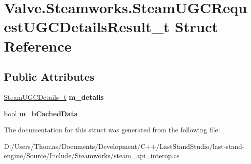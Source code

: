 \hypertarget{structValve_1_1Steamworks_1_1SteamUGCRequestUGCDetailsResult__t}{}\section{Valve.\+Steamworks.\+Steam\+U\+G\+C\+Request\+U\+G\+C\+Details\+Result\+\_\+t Struct Reference}
\label{structValve_1_1Steamworks_1_1SteamUGCRequestUGCDetailsResult__t}
\subsection*{Public Attributes}
\begin{DoxyCompactItemize}
\item 
\hypertarget{structValve_1_1Steamworks_1_1SteamUGCRequestUGCDetailsResult__t_a60a06f0c9f64c8292a369eb0ddaf27db}{}\hyperlink{structValve_1_1Steamworks_1_1SteamUGCDetails__t}{Steam\+U\+G\+C\+Details\+\_\+t} {\bfseries m\+\_\+details}\label{structValve_1_1Steamworks_1_1SteamUGCRequestUGCDetailsResult__t_a60a06f0c9f64c8292a369eb0ddaf27db}

\item 
\hypertarget{structValve_1_1Steamworks_1_1SteamUGCRequestUGCDetailsResult__t_aa3018885358b707adb4075f575ea5c4f}{}bool {\bfseries m\+\_\+b\+Cached\+Data}\label{structValve_1_1Steamworks_1_1SteamUGCRequestUGCDetailsResult__t_aa3018885358b707adb4075f575ea5c4f}

\end{DoxyCompactItemize}


The documentation for this struct was generated from the following file\+:\begin{DoxyCompactItemize}
\item 
D\+:/\+Users/\+Thomas/\+Documents/\+Development/\+C++/\+Last\+Stand\+Studio/last-\/stand-\/engine/\+Source/\+Include/\+Steamworks/steam\+\_\+api\+\_\+interop.\+cs\end{DoxyCompactItemize}
